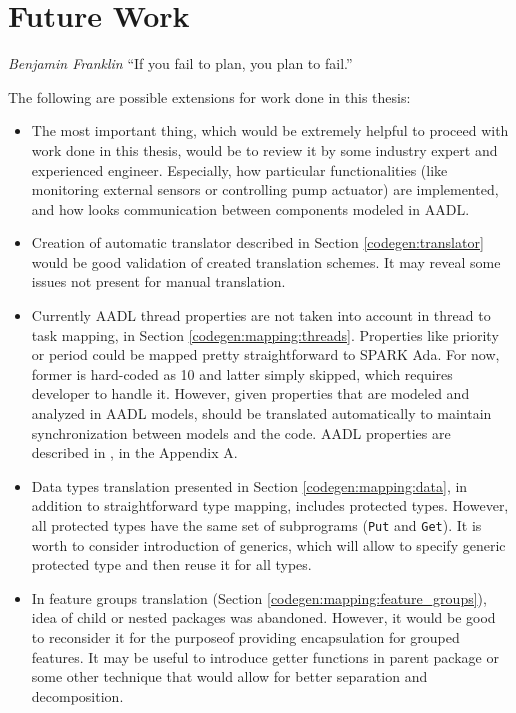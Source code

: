 
\cleardoublepage

\chapter{Future Work}
\label{future_work}

\begin{chapquote}{\textit{Benjamin Franklin}}
``If you fail to plan, you plan to fail.''
\end{chapquote}

The following are possible extensions for work done in this thesis:

\begin{itemize}
	\item The most important thing, which would be extremely helpful to proceed with work done in this thesis, would be to review it by some industry expert and experienced engineer. Especially, how particular functionalities (like monitoring external sensors or controlling pump actuator) are implemented, and how looks communication between components modeled in AADL.
	\item Creation of automatic translator described in Section \ref{codegen:translator} would be good validation of created translation schemes. It may reveal some issues not present for manual translation.
	\item Currently AADL thread properties are not taken into account in thread to task mapping, in Section \ref{codegen:mapping:threads}. Properties like priority or period could be mapped pretty straightforward to SPARK Ada. For now, former is hard-coded as 10 and latter simply skipped, which requires developer to handle it. However, given properties that are modeled and analyzed in AADL models, should be translated automatically to maintain synchronization between models and the code. AADL properties are described in \cite{AadlBook}, in the Appendix A.
	\item Data types translation presented in Section \ref{codegen:mapping:data}, in addition to straightforward type mapping, includes protected types. However, all protected types have the same set of subprograms (\lstinline{Put} and \lstinline{Get}). It is worth to consider introduction of generics, which will allow to specify generic protected type and then reuse it for all types.
	\item In feature groups translation (Section \ref{codegen:mapping:feature_groups}), idea of child or nested packages was abandoned. However, it would be good to reconsider it for the purposeof providing encapsulation for grouped features. It may be useful to introduce getter functions in parent package or some other technique that would allow for better separation and decomposition.

\end{itemize}
